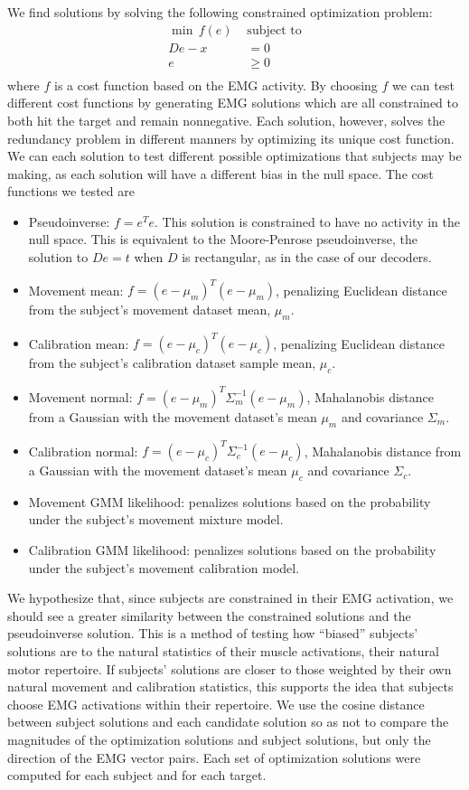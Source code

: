 \documentclass[../main.tex]{subfiles}
\begin{document}
    We find solutions by solving the following constrained optimization problem:
    \begin{align*}
      \min \,f(e) \,\, &\mathrm{subject \,\, to}\\
      De - x &= 0\\
      e &\geq 0\\
    \end{align*}
    where $f$ is a cost function based on the EMG activity. By choosing $f$ we can test different cost functions by generating EMG solutions which are all constrained to both hit the target and remain nonnegative. Each solution, however, solves the redundancy problem in different manners by optimizing its unique cost function. We can each solution to test different possible optimizations that subjects may be making, as each solution will have a different bias in the null space. The cost functions we tested are
    \begin{itemize}
      \item Pseudoinverse: $f = e^Te$. This solution is constrained to have no activity in the null space. This is equivalent to the Moore-Penrose pseudoinverse, the solution to $De=t$ when $D$ is rectangular, as in the case of our decoders.
      \item Movement mean: $f = (e - \mu_m)^T(e - \mu_m)$, penalizing Euclidean distance from the subject's movement dataset mean, $\mu_m$.
      \item Calibration mean: $f = (e - \mu_c)^T(e - \mu_c)$, penalizing Euclidean distance from the subject's calibration dataset sample mean, $\mu_c$.
      \item Movement normal: $f = (e - \mu_m)^T\Sigma_m^{-1}(e - \mu_m)$, Mahalanobis distance from a Gaussian with the movement dataset's mean $\mu_m$ and covariance $\Sigma_m$.
      \item Calibration normal: $f = (e - \mu_c)^T\Sigma_c^{-1}(e - \mu_c)$, Mahalanobis distance from a Gaussian with the movement dataset's mean $\mu_c$ and covariance $\Sigma_c$.
      \item Movement GMM likelihood: penalizes solutions based on the probability under the subject's movement mixture model.
      \item Calibration GMM likelihood: penalizes solutions based on the probability under the subject's movement calibration model.
    \end{itemize}
    We hypothesize that, since subjects are constrained in their EMG activation, we should see a greater similarity between the constrained solutions and the pseudoinverse solution. This is a method of testing how ``biased'' subjects' solutions are to the natural statistics of their muscle activations, their natural motor repertoire. If subjects' solutions are closer to those weighted by their own natural movement and calibration statistics, this supports the idea that subjects choose EMG activations within their repertoire. We use the cosine distance between subject solutions and each candidate solution so as not to compare the magnitudes of the optimization solutions and subject solutions, but only the direction of the EMG vector pairs. Each set of optimization solutions were computed for each subject and for each target.
    
\end{document}
